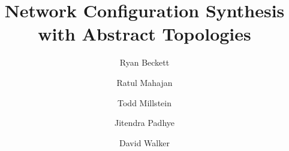 \documentclass{sig-alternate-10pt}
\begin{document}

\setlength{\pdfpageheight}{\paperheight}
\setlength{\pdfpagewidth}{\paperwidth}

\title{Network Configuration Synthesis with Abstract Topologies}



\author{%
Ryan Beckett\\
\and
Ratul Mahajan\\
\and
Todd Millstein\\
\and
Jitendra Padhye\\
\and
David Walker\\
}

\maketitle


%
%
%
%


%
%
%
%
%
\end{document}
